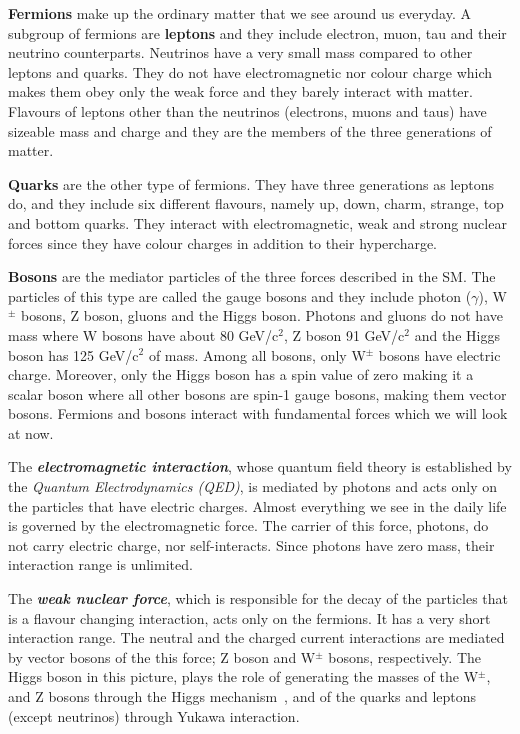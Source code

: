\textbf{Fermions} make up the ordinary matter that we see around us everyday. A subgroup of fermions are \textbf{leptons} and they include electron, muon, tau and their neutrino counterparts. Neutrinos have a very small mass compared to other leptons and quarks. They do not have electromagnetic nor colour charge which makes them obey only the weak force and they barely interact with matter. Flavours of leptons other than the neutrinos (electrons, muons and taus) have sizeable mass and charge and they are the members of the three generations of matter.

\textbf{Quarks} are the other type of fermions. They have three generations as leptons do, and they include six different flavours, namely up, down, charm, strange, top and bottom quarks. They interact with electromagnetic, weak and strong nuclear forces since they have colour charges in addition to their hypercharge. 

\textbf{Bosons} are the mediator particles of the three forces described in the SM. The particles of this type are called the gauge bosons and they include photon ($\gamma$), W$^{\pm}$ bosons, Z boson, gluons and the Higgs boson. Photons and gluons do not have mass where W bosons have about 80 GeV/c$^{2}$, Z boson 91 GeV/c$^{2}$ and the Higgs boson has 125 GeV/c$^{2}$ of mass. Among all bosons, only W$^{\pm}$ bosons have electric charge. Moreover, only the Higgs boson has a spin value of zero making it a scalar boson where all other bosons are spin-1 gauge bosons, making them vector bosons. Fermions and bosons interact with fundamental forces which we will look at now.

The \textit{\textbf{electromagnetic interaction}}, whose quantum field theory is established by the \emph{Quantum Electrodynamics (QED)}, is mediated by photons and acts only on the particles that have electric charges.  Almost everything we see in the daily life is governed by the electromagnetic force. The carrier of this force, photons, do not carry electric charge, nor self-interacts. Since photons have zero mass, their interaction range is unlimited.

The \emph{\textbf{weak nuclear force}}, which is responsible for the decay of the particles that is a flavour changing interaction, acts only on the fermions. It has a very short interaction range. The neutral and the charged current interactions are mediated by vector bosons of the this force; Z boson and W$^{\pm}$ bosons, respectively. The Higgs boson in this picture, plays the role of generating the masses of the W$^{\pm}$, and Z bosons through the Higgs mechanism~\cite{Higgs1964, BroutEnglert, Guralnik1964}, and of the quarks and leptons (except neutrinos) through Yukawa interaction\cite{Weinberg1967}.

